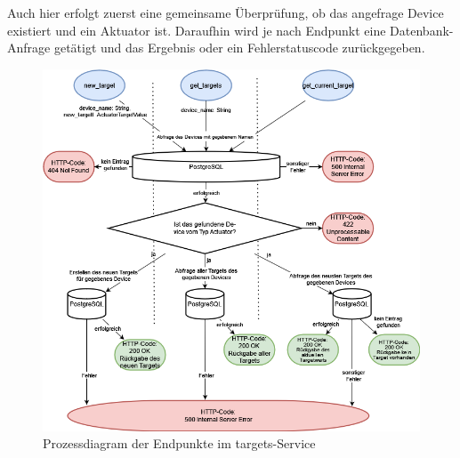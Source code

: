         Auch hier erfolgt zuerst eine gemeinsame Überprüfung, ob das angefrage Device existiert und ein Aktuator ist.
        Daraufhin wird je nach Endpunkt eine Datenbank-Anfrage getätigt und das Ergebnis oder ein Fehlerstatuscode zurückgegeben.

        \begin{figure}[H]
            \includegraphics[width=1.05\linewidth]{images/prozessdiagramm_backend_targets.drawio.png}
            \centering
            \caption{Prozessdiagram der Endpunkte im targets-Service}
            \label{fig:backend-service-targets}
        \end{figure}

\pagebreak
